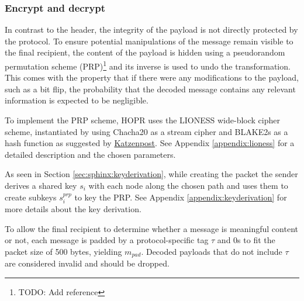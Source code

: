 \subsubsection{Encrypt and decrypt}
\label{sec:sphinx:payload}

In contrast to the header, the integrity of the payload is not directly protected by the protocol. To ensure potential manipulations of the message remain visible to the final recipient, the content of the payload is hidden using a pseudorandom permutation scheme (PRP)\footnote{TODO: Add reference} and its inverse is used to undo the transformation. This comes with the property that if there were any modifications to the payload, such as a bit flip, the probability that the decoded message contains any relevant information is expected to be negligible.

To implement the PRP scheme, HOPR uses the LIONESS \cite{lionesspaper} wide-block cipher scheme, instantiated by using Chacha20 as a stream cipher and BLAKE2s as a hash function as suggested by \href{https://katzenpost.mixnetworks.org/docs/specs/lioness.html}{Katzenpost}. See Appendix \ref{appendix:lioness} for a detailed description and the chosen parameters.

As seen in Section \ref{sec:sphinx:keyderivation}, while creating the packet the sender derives a shared key $s_i$ with each node along the chosen path and uses them to create subkeys $s_i^{prp}$ to key the PRP. See Appendix \ref{appendix:keyderivation} for more details about the key derivation.

To allow the final recipient to determine whether a message is meaningful content or not, each message is padded by a protocol-specific tag $\tau$ and 0s to fit the packet size of 500 bytes, yielding $m_{pad}$. Decoded payloads that do not include $\tau$ are considered invalid and should be dropped.

